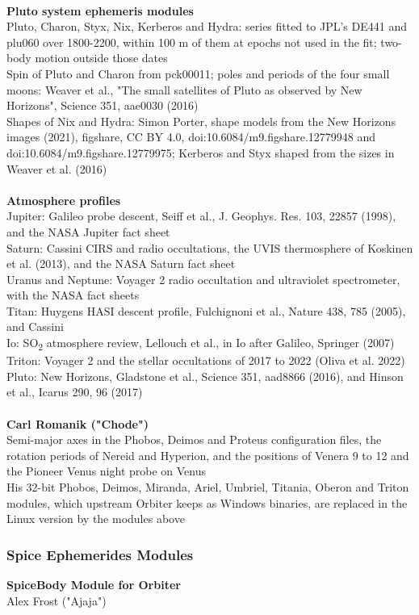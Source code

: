 \documentclass[Orbiter User Manual.tex]{subfiles}
\begin{document}
\\
\textbf{Pluto system ephemeris modules}\\
Pluto, Charon, Styx, Nix, Kerberos and Hydra: series fitted to JPL's DE441 and plu060 over 1800-2200, within 100 m of them at epochs not used in the fit; two-body motion outside those dates\\
Spin of Pluto and Charon from pck00011; poles and periods of the four small moons: Weaver et al., "The small satellites of Pluto as observed by New Horizons", Science 351, aae0030 (2016)\\
Shapes of Nix and Hydra: Simon Porter, shape models from the New Horizons images (2021), figshare, CC BY 4.0, doi:10.6084/m9.figshare.12779948 and doi:10.6084/m9.figshare.12779975; Kerberos and Styx shaped from the sizes in Weaver et al. (2016)\\
\\
\textbf{Atmosphere profiles}\\
Jupiter: Galileo probe descent, Seiff et al., J. Geophys. Res. 103, 22857 (1998), and the NASA Jupiter fact sheet\\
Saturn: Cassini CIRS and radio occultations, the UVIS thermosphere of Koskinen et al. (2013), and the NASA Saturn fact sheet\\
Uranus and Neptune: Voyager 2 radio occultation and ultraviolet spectrometer, with the NASA fact sheets\\
Titan: Huygens HASI descent profile, Fulchignoni et al., Nature 438, 785 (2005), and Cassini\\
Io: SO\textsubscript{2} atmosphere review, Lellouch et al., in Io after Galileo, Springer (2007)\\
Triton: Voyager 2 and the stellar occultations of 2017 to 2022 (Oliva et al. 2022)\\
Pluto: New Horizons, Gladstone et al., Science 351, aad8866 (2016), and Hinson et al., Icarus 290, 96 (2017)\\
\\
\textbf{Carl Romanik ("Chode")}\\
Semi-major axes in the Phobos, Deimos and Proteus configuration files, the rotation periods of Nereid and Hyperion, and the positions of Venera 9 to 12 and the Pioneer Venus night probe on Venus\\
His 32-bit Phobos, Deimos, Miranda, Ariel, Umbriel, Titania, Oberon and Triton modules, which upstream Orbiter keeps as Windows binaries, are replaced in the Linux version by the modules above
\\
\subsubsection{Spice Ephemerides Modules}
\textbf{SpiceBody Module for Orbiter}\\
Alex Frost ("Ajaja")\\
\end{document}
